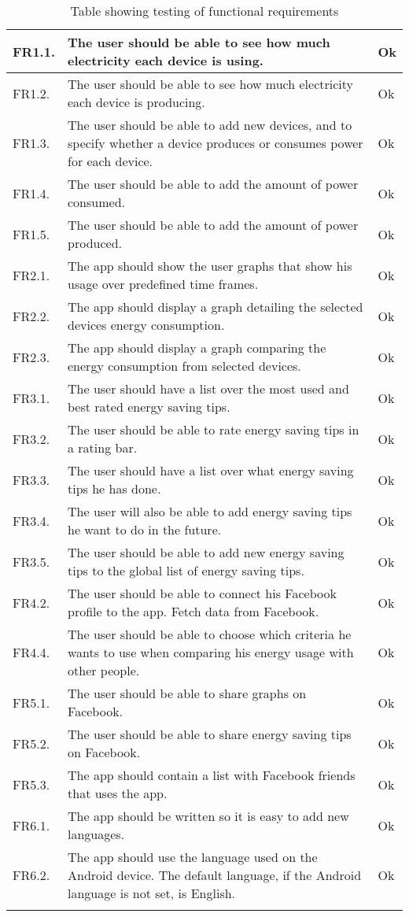 \begin{longtable}{|l|p{12.5cm}|l|}
\hline
FR1.1. &The user should be able to see how much electricity each device is using.&Ok\\\hline
FR1.2. &The user should be able to see how much electricity each device is producing.&Ok\\\hline
FR1.3. &The user should be able to add new devices, and to specify whether a device produces or consumes power for each device.&Ok\\\hline
FR1.4. &The user should be able to add the amount of power consumed.&Ok\\\hline
FR1.5. &The user should be able to add the amount of power produced.&Ok\\\hline
FR2.1. &The app should show the user graphs that show his usage over predefined time frames.&Ok\\\hline
FR2.2. &The app should display a graph detailing the selected devices energy consumption.&Ok\\\hline
FR2.3. &The app should display a graph comparing the energy consumption from selected devices.&Ok\\\hline
FR3.1. &The user should have a list over the most used and best rated energy saving tips.&Ok\\\hline
FR3.2. &The user should be able to rate energy saving tips in a rating bar.&Ok\\\hline
FR3.3. &The user should have a list over what energy saving tips he has done.&Ok\\\hline
FR3.4. &The user will also be able to add energy saving tips he want to do in the future.&Ok\\\hline
FR3.5. &The user should be able to add new energy saving tips to the global list of energy saving tips.&Ok\\\hline
FR4.2. &The user should be able to connect his Facebook profile to the app. Fetch data from Facebook.&Ok\\\hline
FR4.4. &The user should be able to choose which criteria he wants to use when comparing his energy usage with other people.&Ok\\\hline
FR5.1. &The user should be able to share graphs on Facebook.&Ok\\\hline
FR5.2. &The user should be able to share energy saving tips on Facebook.&Ok\\\hline
FR5.3. &The app should contain a list with Facebook friends that uses the app.&Ok\\\hline
FR6.1. &The app should be written so it is easy to add new languages.&Ok\\\hline
FR6.2. &The app should use the language used on the Android device. The default language, if the Android language is not set, is English.&Ok\\\hline
\caption{Table showing testing of functional requirements}
\label{tab:testTable}
\end{longtable} 

